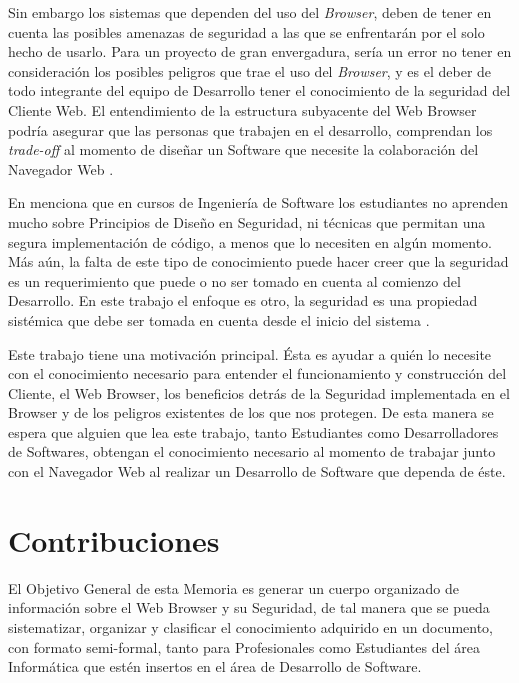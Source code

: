 Sin embargo los sistemas que dependen del uso del \textit{Browser}, deben de tener en cuenta las posibles amenazas de seguridad a las que se enfrentarán por el solo hecho de usarlo. Para un proyecto de gran envergadura, sería un error no tener en consideración los posibles peligros que trae el uso del \textit{Browser}, y es el deber de todo integrante del equipo de Desarrollo tener el conocimiento de la seguridad del Cliente Web. El entendimiento de la estructura subyacente del Web Browser podría asegurar que las personas que trabajen en el desarrollo, comprendan los \textit{trade-off} al momento de diseñar un Software que necesite la colaboración del Navegador Web \cite{535061, 2005-grosskurth-browser-refarch,preprint-grosskurth-browser-archevol}.

En \cite{goertzel2007software} menciona que en cursos de Ingeniería de Software los estudiantes no aprenden mucho sobre Principios de Diseño en Seguridad, ni técnicas que permitan una segura implementación de código, a menos que lo necesiten en algún momento. Más aún, la falta de este tipo de conocimiento puede hacer creer que la seguridad es un requerimiento que puede o no ser tomado en cuenta al comienzo del Desarrollo. En este trabajo el enfoque es otro, la seguridad es una propiedad sistémica que debe ser tomada en cuenta desde el inicio del sistema \cite{fernandez2004methodology, fernandez2006defining, braz2008eliciting, fernandez2013security}.

Este trabajo tiene una motivación principal. Ésta es ayudar a quién lo necesite con el conocimiento necesario para entender el funcionamiento y construcción del Cliente, el Web Browser, los beneficios detrás de la Seguridad implementada en el Browser y de los peligros existentes de los que nos protegen. De esta manera se espera que alguien que lea este trabajo, tanto Estudiantes como Desarrolladores de Softwares, obtengan el conocimiento necesario al momento de trabajar junto con el Navegador Web al realizar un Desarrollo de Software que dependa de éste.



\section{Contribuciones}
\label{chap1:contr}

El Objetivo General de esta Memoria es generar un cuerpo organizado de información sobre el Web Browser y su Seguridad, de tal manera que se pueda sistematizar, organizar y clasificar el conocimiento adquirido en un documento, con formato semi-formal, tanto para Profesionales como Estudiantes del área Informática que estén insertos en el área de Desarrollo de Software. 

